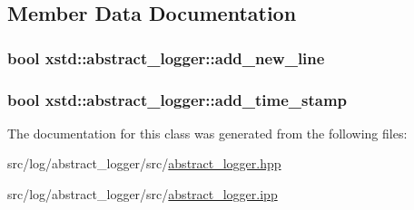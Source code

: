 \subsection{Member Data Documentation}
\hypertarget{classxstd_1_1abstract__logger_a5216ec0a18fea2571db19d5a55d8700f}{
\subsubsection[{add\-\_\-new\-\_\-line}]{\setlength{\rightskip}{0pt plus 5cm}bool xstd\-::abstract\-\_\-logger\-::add\-\_\-new\-\_\-line}}\label{classxstd_1_1abstract__logger_a5216ec0a18fea2571db19d5a55d8700f}
\hypertarget{classxstd_1_1abstract__logger_a534b4f6a3dcdd3b7f18abfcb1bb5b937}{
\subsubsection[{add\-\_\-time\-\_\-stamp}]{\setlength{\rightskip}{0pt plus 5cm}bool xstd\-::abstract\-\_\-logger\-::add\-\_\-time\-\_\-stamp}}\label{classxstd_1_1abstract__logger_a534b4f6a3dcdd3b7f18abfcb1bb5b937}


The documentation for this class was generated from the following files\-:\begin{DoxyCompactItemize}
\item 
src/log/abstract\-\_\-logger/src/\hyperlink{abstract__logger_8hpp}{abstract\-\_\-logger.\-hpp}\item 
src/log/abstract\-\_\-logger/src/\hyperlink{abstract__logger_8ipp}{abstract\-\_\-logger.\-ipp}\end{DoxyCompactItemize}
